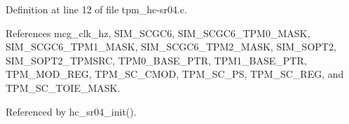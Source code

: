Definition at line 12 of file tpm\+\_\+hc-\/sr04.\+c.



References mcg\+\_\+clk\+\_\+hz, S\+I\+M\+\_\+\+S\+C\+G\+C6, S\+I\+M\+\_\+\+S\+C\+G\+C6\+\_\+\+T\+P\+M0\+\_\+\+M\+A\+SK, S\+I\+M\+\_\+\+S\+C\+G\+C6\+\_\+\+T\+P\+M1\+\_\+\+M\+A\+SK, S\+I\+M\+\_\+\+S\+C\+G\+C6\+\_\+\+T\+P\+M2\+\_\+\+M\+A\+SK, S\+I\+M\+\_\+\+S\+O\+P\+T2, S\+I\+M\+\_\+\+S\+O\+P\+T2\+\_\+\+T\+P\+M\+S\+RC, T\+P\+M0\+\_\+\+B\+A\+S\+E\+\_\+\+P\+TR, T\+P\+M1\+\_\+\+B\+A\+S\+E\+\_\+\+P\+TR, T\+P\+M\+\_\+\+M\+O\+D\+\_\+\+R\+EG, T\+P\+M\+\_\+\+S\+C\+\_\+\+C\+M\+OD, T\+P\+M\+\_\+\+S\+C\+\_\+\+PS, T\+P\+M\+\_\+\+S\+C\+\_\+\+R\+EG, and T\+P\+M\+\_\+\+S\+C\+\_\+\+T\+O\+I\+E\+\_\+\+M\+A\+SK.



Referenced by hc\+\_\+sr04\+\_\+init().

